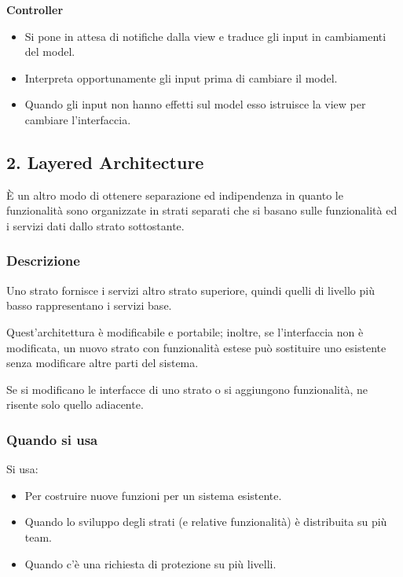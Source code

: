 \documentclass{report}
\begin{document}
\medskip
\noindent
\textbf{Controller}
\begin{itemize}
    \item Si pone in attesa di notifiche dalla view e traduce gli input in cambiamenti del model.
    \item Interpreta opportunamente gli input prima di cambiare il model.
    \item Quando gli input non hanno effetti sul model esso istruisce la view per cambiare l'interfaccia.
\end{itemize}

\newpage
\subsection*{2. Layered Architecture}
\`E un altro modo di ottenere separazione ed indipendenza in quanto le funzionalità sono organizzate in strati separati che si basano sulle funzionalità ed i servizi dati dallo strato sottostante.

\subsubsection*{Descrizione}
Uno strato fornisce i servizi altro strato superiore, quindi quelli di livello più basso rappresentano i servizi base.

\noindent
Quest'architettura è modificabile e portabile; inoltre, se l'interfaccia non è modificata, un nuovo strato con funzionalità estese può sostituire uno esistente senza modificare altre parti del sistema.

\noindent
Se si modificano le interfacce di uno strato o si aggiungono funzionalità, ne risente solo quello adiacente.

\subsubsection*{Quando si usa}
Si usa:
\begin{itemize}
    \item Per costruire nuove funzioni per un sistema esistente.
    \item Quando lo sviluppo degli strati (e relative funzionalità) è distribuita su più team.
    \item Quando c'è una richiesta di protezione su più livelli.
\end{itemize}
\end{document}
